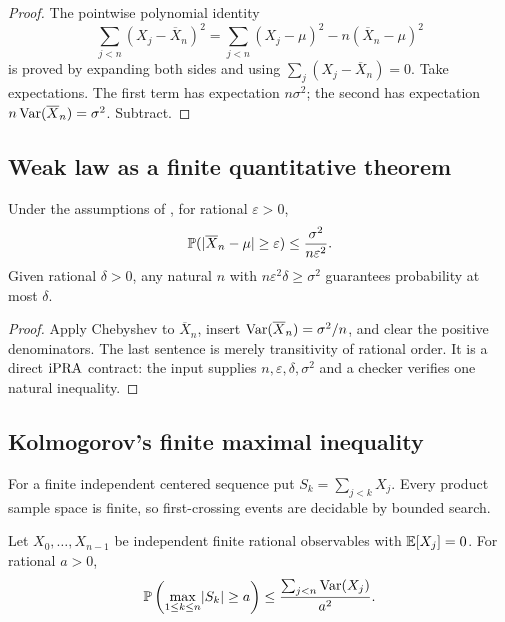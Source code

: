 \begin{proof}
The pointwise polynomial identity
\[
 \sum_{j<n}(X_j-\overline X_n)^2
 =\sum_{j<n}(X_j-\mu)^2-n(\overline X_n-\mu)^2
\]
is proved by expanding both sides and using
\(\sum_j(X_j-\overline X_n)=0\).  Take expectations.  The first term has
expectation \(n\sigma^2\); the second has expectation
\(n\operatorname{Var}(\overline X_n)=\sigma^2\).  Subtract.
\end{proof}

\subsection{Weak law as a finite quantitative theorem}

\begin{theorem}\label{thm:weak-law}
Under the assumptions of , for rational
\(\varepsilon>0\),
\[
 \mathbb P(\lvert \overline X_n-\mu\rvert\ge\varepsilon)
 \le\frac{\sigma^2}{n\varepsilon^2}.
\]
Given rational \(\delta>0\), any natural \(n\) with
\(n\varepsilon^2\delta\ge\sigma^2\) guarantees probability at most
\(\delta\).
\end{theorem}

\begin{proof}
Apply Chebyshev to \(\overline X_n\), insert
\(\operatorname{Var}(\overline X_n)=\sigma^2/n\), and clear the positive denominators.  The
last sentence is merely transitivity of rational order.  It is a direct
\(\mathrm{iPRA}\) contract: the input supplies \(n,\varepsilon,\delta,\sigma^2\) and
a checker verifies one natural inequality.
\end{proof}

\subsection{Kolmogorov's finite maximal inequality}

For a finite independent centered sequence put
\(S_k=\sum_{j<k}X_j\).  Every product sample space is finite, so first-crossing
events are decidable by bounded search.

\begin{theorem}\label{thm:kolmogorov}
Let \(X_0,\ldots,X_{n-1}\) be independent finite rational observables with
\(\mathbb E[X_j]=0\).  For rational \(a>0\),
\[
 \mathbb P\left(\max_{1\le k\le n}\lvert S_k\rvert\ge a\right)
 \le\frac{\sum_{j<n}\operatorname{Var}(X_j)}{a^2}.
\]
\end{theorem}

